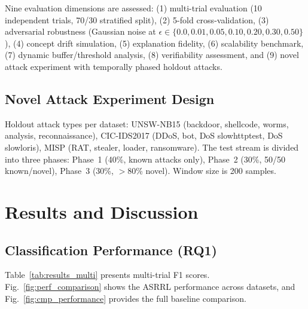 \documentclass[conference]{IEEEtran}
\newcommand{\ASRRL}{\textsc{ASRRL}}
\begin{document}
Nine evaluation dimensions are assessed: (1) multi-trial evaluation (10 independent trials, 70/30 stratified split), (2) 5-fold cross-validation, (3) adversarial robustness (Gaussian noise at $\epsilon \in \{0.0, 0.01, 0.05, 0.10, 0.20, 0.30, 0.50\}$), (4) concept drift simulation, (5) explanation fidelity, (6) scalability benchmark, (7) dynamic buffer/threshold analysis, (8) verifiability assessment, and (9) novel attack experiment with temporally phased holdout attacks.

\subsection{Novel Attack Experiment Design}

Holdout attack types per dataset: UNSW-NB15 (backdoor, shellcode, worms, analysis, reconnaissance), CIC-IDS2017 (DDoS, bot, DoS slowhttptest, DoS slowloris), MISP (RAT, stealer, loader, ransomware). The test stream is divided into three phases: Phase~1 (40\%, known attacks only), Phase~2 (30\%, 50/50 known/novel), Phase~3 (30\%, $>$80\% novel). Window size is 200 samples.


\section{Results and Discussion}
\label{sec:results}

\subsection{Classification Performance (RQ1)}

Table~\ref{tab:results_multi} presents multi-trial F1 scores. Fig.~\ref{fig:perf_comparison} shows the \ASRRL{} performance across datasets, and Fig.~\ref{fig:cmp_performance} provides the full baseline comparison.
\end{document}
